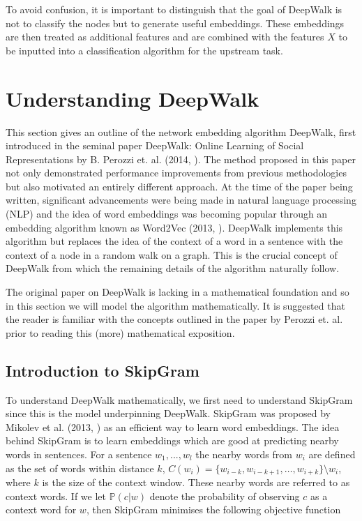 \documentclass[a4paper]{article}
\renewcommand{\P}{\mathbb P}
\begin{document}
To avoid confusion, it is important to distinguish that the goal of DeepWalk is
not to classify the nodes but to generate useful embeddings. These embeddings
are then treated as additional features and are combined with the features $X$
to be inputted into a classification algorithm for the upstream task.
\section{Understanding DeepWalk}
This section gives an outline of the network embedding algorithm
DeepWalk, first introduced in the seminal paper DeepWalk: Online Learning of
Social Representations by B. Perozzi et. al. (2014, \cite{deepwalk}). The method proposed in
this paper not only demonstrated performance improvements from previous methodologies but
also motivated an entirely different approach. At the time of the paper being
written, significant advancements were being made in natural language processing (NLP)
and the idea of word embeddings was becoming popular through an embedding
algorithm known as Word2Vec (2013, \cite{mikolov2013efficient,mikolov2013distributed}).
DeepWalk implements this algorithm but replaces the idea of the context of a word in
a sentence with the context of a node in a random walk on a graph. This is the
crucial concept of DeepWalk from which the remaining details of the algorithm naturally follow.

The original paper on DeepWalk is lacking in a mathematical foundation and so in
this section we will model the algorithm mathematically. It is suggested that the reader
is familiar with the concepts outlined in the paper by Perozzi et. al. prior to
reading this (more) mathematical exposition.
\subsection{Introduction to SkipGram}
To understand DeepWalk mathematically, we first need to understand SkipGram since this is the model underpinning DeepWalk. SkipGram was
proposed by Mikolev et al. (2013, \cite{mikolov2013efficient}) as an efficient way to
learn word embeddings. The idea behind SkipGram is to learn embeddings which are good at
predicting nearby words in sentences. For a sentence $w_1, ... , w_l$ the
nearby words from $w_i$ are defined as the set of words
within distance $k$, $C(w_i) = \{w_{i-k}, w_{i-k+1}, \dots , w_{i+k}\} \setminus w_i$, where $k$ is the size of the context window. These nearby words are referred to as context words. If we let $\P(c|w)$ denote the probability of observing $c$ as a context word for $w$, then SkipGram
minimises the following objective function
\end{document}
